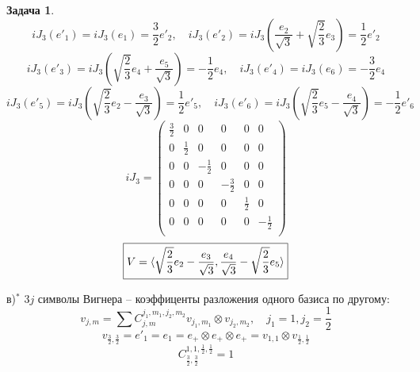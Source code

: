 \documentclass[12pt]{article}
\theoremstyle{definition}
\newtheorem{zad}{Задача}[section]
\begin{document}
\begin{zad}
    \begin{equation}
        iJ_3(e'_1)=iJ_3(e_1)=\frac{3}{2}e'_2,\quad iJ_3(e'_2)=iJ_3\left(\frac{e_2}{\sqrt{3}}+\sqrt{\frac{2}{3}}e_3\right)=\frac{1}{2}e'_2
    \end{equation}
    \begin{equation}
        iJ_3(e'_3)=iJ_3\left(\sqrt{\frac{2}{3}}e_4+\frac{e_5}{\sqrt{3}}\right)=-\frac{1}{2}e_4,\quad iJ_3(e'_4)=iJ_3(e_6)=-\frac{3}{2}e_4
    \end{equation}
    \begin{equation}
        iJ_3(e'_5)=iJ_3\left(\sqrt{\frac{2}{3}}e_2-\frac{e_3}{\sqrt{3}}\right)=\frac{1}{2}e'_5,\quad iJ_3(e'_6)=iJ_3\left(\sqrt{\frac{2}{3}}e_5-\frac{e_4}{\sqrt{3}}\right)=-\frac{1}{2}e'_6
    \end{equation}
    \begin{equation}
        iJ_3=\left(
    \begin{array}{cccccc}
    \frac{3}{2} & 0 & 0 & 0 & 0 & 0\\
    0 & \frac{1}{2} & 0 & 0 & 0 & 0\\
    0 & 0 & -\frac{1}{2} & 0 & 0 & 0\\
    0 & 0 & 0 & -\frac{3}{2} & 0 & 0\\
    0 & 0 & 0 & 0 & \frac{1}{2} & 0\\
    0 & 0 & 0 & 0 & 0 & -\frac{1}{2}\\
    \end{array}
    \right)
    \end{equation}
    \begin{equation}
        \boxed{V=\braket{\sqrt{\frac{2}{3}}e_2-\frac{e_3}{\sqrt{3}},\frac{e_4}{\sqrt{3}}-\sqrt{\frac{2}{3}}e_5}}
    \end{equation}
    \item[в)$^*$] $3j$ символы Вигнера -- коэффиценты разложения одного базиса по другому:
    \begin{equation}
        v_{j,m}=\sum C_{j,m}^{j_1,m_1,j_2,m_2}v_{j_1,m_1}\otimes v_{j_2,m_2},\quad j_1=1, j_2=\frac{1}{2}
    \end{equation}
    \begin{equation}
        v_{\frac{3}{2},\frac{3}{2}}=e'_1=e_1=e_+\otimes e_+\otimes e_+=v_{1,1}\otimes v_{\frac{1}{2},\frac{1}{2}}
    \end{equation}
    \begin{equation}
        \boxed{C_{\frac{3}{2},\frac{3}{2}}^{1,1,\frac{1}{2},\frac{1}{2}}=1}
    \end{equation}
    

\end{zad}
\end{document}
